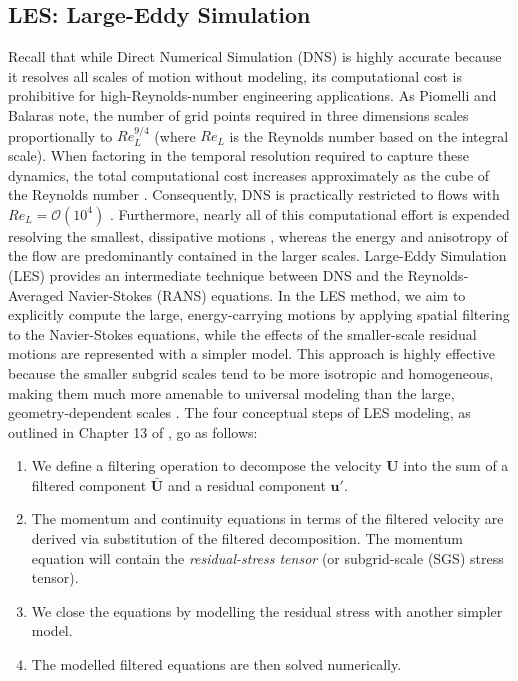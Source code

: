 \documentclass[12pt,letterpaper]{article}
\begin{document}
\subsection{\textbf{LES: Large-Eddy Simulation}}Recall that while Direct Numerical Simulation (DNS) is highly accurate because it resolves all scales of motion without modeling, its computational cost is prohibitive for high-Reynolds-number engineering applications. As Piomelli and Balaras \cite{piomelli2002wall} note, the number of grid points required in three dimensions scales proportionally to $Re_L^{9/4}$ (where $Re_L$ is the Reynolds number based on the integral scale). When factoring in the temporal resolution required to capture these dynamics, the total computational cost increases approximately as the cube of the Reynolds number \cite{pope2000}. Consequently, DNS is practically restricted to flows with $Re_L = \mathcal{O}(10^4)$ \cite{piomelli2002wall}. Furthermore, nearly all of this computational effort is expended resolving the smallest, dissipative motions \cite{pope2000}, whereas the energy and anisotropy of the flow are predominantly contained in the larger scales. Large-Eddy Simulation (LES) provides an intermediate technique between DNS and the Reynolds-Averaged Navier-Stokes (RANS) equations. In the LES method, we aim to explicitly compute the large, energy-carrying motions by applying spatial filtering to the Navier-Stokes equations, while the effects of the smaller-scale residual motions are represented with a simpler model. This approach is highly effective because the smaller subgrid scales tend to be more isotropic and homogeneous, making them much more amenable to universal modeling than the large, geometry-dependent scales \cite{piomelli2002wall}. The four conceptual steps of LES modeling, as outlined in Chapter 13 of \cite{pope2000}, go as follows:
\begin{enumerate}
    \item We define a filtering operation to decompose the velocity $\mathbf{U}$ into the sum of a filtered component $\bar{\mathbf{U}}$ and a residual component $\mathbf{u'}$. 
    \item The momentum and continuity equations in terms of the filtered velocity are derived via substitution of the filtered decomposition. The momentum equation will contain the \emph{residual-stress tensor} (or subgrid-scale (SGS) stress tensor). 
    \item We close the equations by modelling the residual stress with another simpler model.
    \item The modelled filtered equations are then solved numerically. 
\end{enumerate} 
\end{document}
